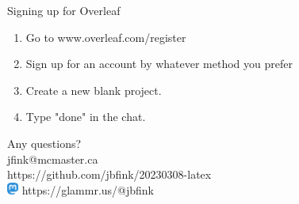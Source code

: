 \documentclass[handout]{beamer} %
\begin{document}
\begin{frame}{Signing up for Overleaf}
	\begin{enumerate}
		\item Go to www.overleaf.com/register
		\item Sign up for an account by whatever method you prefer
		\item Create a new blank project.
		\item Type "done" in the chat.
	\end{enumerate}
\end{frame}


\begin{frame}
	Any questions?\\ 
	jfink@mcmaster.ca\\
	https://github.com/jbfink/20230308-latex\\
\includegraphics[left, height=4mm]{mastodon} \hspace{1mm}  https://glammr.us/@jbfink
	
\end{frame}
\end{document}
